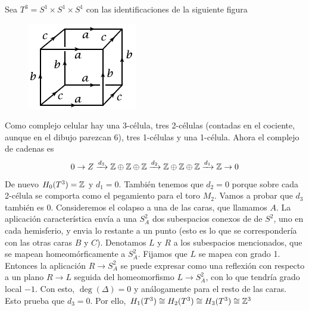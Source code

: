 \documentclass[TA.tex]{subfiles}
\begin{document}
\begin{ej}
Sea $T^3=S^1\times S^1\times S^1$ con las identificaciones de la siguiente figura 

\begin{figure}[h!]
\includegraphics[scale=0.7]{izquierda}
\end{figure}

Como complejo celular hay una 3-célula, tres 2-células (contadas en el cociente, aunque en el dibujo parezcan 6), tres 1-células y una 1-célula. Ahora el complejo de cadenas es
\[
0\to Z\xrightarrow{d_3}\mathbb{Z}\oplus\mathbb{Z}\oplus\mathbb{Z}\xrightarrow{d_2}\mathbb{Z}\oplus\mathbb{Z}\oplus\mathbb{Z}\xrightarrow{d_1}\mathbb{Z}\to 0
\]
De nuevo $H_0(T^3)=\mathbb{Z}$ y $d_1=0$. También tenemos que $d_2=0$ porque sobre cada 2-célula se comporta como el pegamiento para el toro $M_2$. Vamos a probar que $d_3$ también es 0. Consideremos el colapso a una de las caras, que llamamos $A$. La aplicación característica envía a una $S^2_A$ dos subespacios conexos de de $S^2$, uno en cada hemisferio, y envia lo restante a un punto (esto es lo que se correspondería con las otras caras $B$ y $C$). Denotamos $L$ y $R$ a los subespacios mencionados, que se mapean homeomórficamente a $S^2_A$. Fijamos que $L$ se mapea con grado 1. Entonces la aplicación $R\to S^2_A$ se puede expresar como una reflexión con respecto a un plano $R\to L$ seguida del homeomorfismo $L\to S^2_A$, con lo que tendría grado local $-1$. Con esto, $\deg(\Delta)=0$ y análogamente para el resto de las caras. Esto prueba que $d_3=0$. Por ello, $H_1(T^3)\cong H_2(T^3)\cong H_3(T^3)\cong \mathbb{Z}^3$ 
\end{ej}
\end{document}
